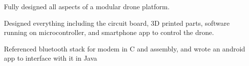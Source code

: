 \documentclass[]{deedy-resume-openfont}
\begin{document}
\begin{minipage}[t]{0.66\textwidth}
\sectionsep


\begin{tightemize}
\item Fully designed all aspects of a modular drone platform.
\item Designed everything including the circuit board, 3D printed parts, software running on microcontroller, and smartphone app to control the drone.
\item Referenced bluetooth stack for modem in C and assembly, and wrote an android app to interface with it in Java
\end{tightemize}

\sectionsep




% 
% 

\end{minipage} 
\end{document}
